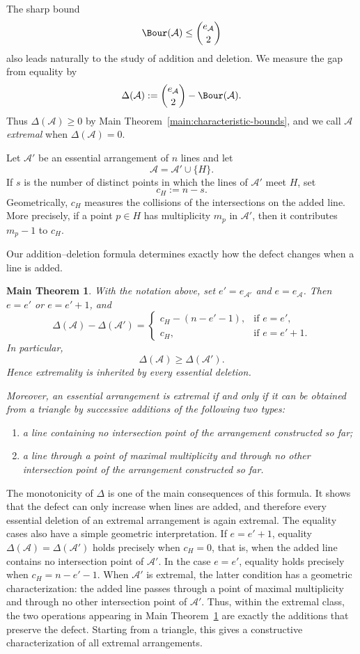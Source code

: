 \documentclass[11pt]{amsart}   %
\newtheorem{mthm}{Main Theorem}
\theoremstyle{definition}
\def\A{{\mathcal A}}
\begin{document}
\medskip

The sharp bound
\[
\Bour(\A)\leq\binom{e_\A}{2}
\]
also leads naturally to the study of addition and deletion. We measure
the gap from equality by
\[
\Delta(\A):=
\binom{e_\A}{2}-\Bour(\A).
\]
Thus $\Delta(\A)\geq0$ by Main
Theorem~\ref{main:characteristic-bounds}, and we call $\A$
\emph{extremal} when $\Delta(\A)=0$.

Let $\A'$ be an essential arrangement of $n$ lines and let
\[
\A=\A'\cup\{H\}.
\]
If $s$ is the number of distinct points in which the lines of $\A'$
meet $H$, set
\[
c_H:=n-s.
\]
Geometrically, $c_H$ measures the collisions of the intersections on
the added line. More precisely, if a point $p\in H$ has multiplicity
$m_p$ in $\A'$, then it contributes $m_p-1$ to $c_H$.

Our addition--deletion formula determines exactly how the defect
changes when a line is added.

\begin{mthm}
\label{main:addition-deletion}
With the notation above, set $e'=e_{\A'}$ and $e=e_\A$. Then
$e=e'$ or $e=e'+1$, and
\[
\Delta(\A)-\Delta(\A')
=
\begin{cases}
c_H-(n-e'-1),&\text{if }e=e',\\[2mm]
c_H,&\text{if }e=e'+1.
\end{cases}
\]
In particular,
\[
\Delta(\A)\geq\Delta(\A').
\]
Hence extremality is inherited by every essential deletion.

Moreover, an essential arrangement is extremal if and only if it can
be obtained from a triangle by successive additions of the following
two types:
\begin{enumerate}
\item a line containing no intersection point of the arrangement
constructed so far;
\item a line through a point of maximal multiplicity and through no
other intersection point of the arrangement constructed so far.
\end{enumerate}
\end{mthm}
The monotonicity of $\Delta$ is one of the main consequences of this
formula. It shows that the defect can only increase when lines are
added, and therefore every essential deletion of an extremal
arrangement is again extremal. The equality cases also have a simple
geometric interpretation. If $e=e'+1$, equality
$\Delta(\A)=\Delta(\A')$ holds precisely when $c_H=0$, that is, when
the added line contains no intersection point of $\A'$. In the
 case $e=e'$, equality holds precisely when
$c_H=n-e'-1$. When $\A'$ is extremal, the latter condition has a
geometric characterization: the added line passes through a point of
maximal multiplicity and through no other intersection point of
$\A'$. Thus, within the extremal class, the two operations appearing
in Main Theorem~\ref{main:addition-deletion} are exactly the additions
that preserve the defect. Starting from a triangle, this gives a
constructive characterization of all extremal arrangements.
\end{document}
